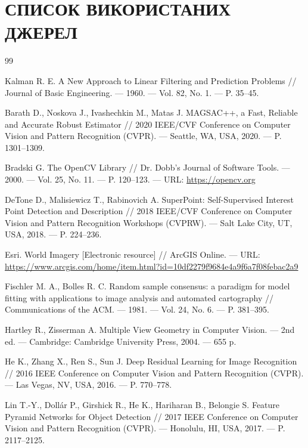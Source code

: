 \documentclass[a4paper, 12pt, titlepage]{article}
\begin{document}
\newpage
\section*{\centering СПИСОК ВИКОРИСТАНИХ ДЖЕРЕЛ}

\begin{thebibliography}{99}

Kalman R. E. A New Approach to Linear Filtering and Prediction Problems // Journal of Basic Engineering. --- 1960. --- Vol. 82, No. 1. --- P. 35--45.

Barath D., Noskova J., Ivashechkin M., Matas J. MAGSAC++, a Fast, Reliable and Accurate Robust Estimator // 2020 IEEE/CVF Conference on Computer Vision and Pattern Recognition (CVPR). --- Seattle, WA, USA, 2020. --- P. 1301--1309.

Bradski G. The OpenCV Library // Dr. Dobb's Journal of Software Tools. --- 2000. --- Vol. 25, No. 11. --- P. 120--123. --- URL: \url{https://opencv.org}

DeTone D., Malisiewicz T., Rabinovich A. SuperPoint: Self-Supervised Interest Point Detection and Description // 2018 IEEE/CVF Conference on Computer Vision and Pattern Recognition Workshops (CVPRW). --- Salt Lake City, UT, USA, 2018. --- P. 224--236.

Esri. World Imagery [Electronic resource] // ArcGIS Online. --- URL: \url{https://www.arcgis.com/home/item.html?id=10df2279f9684e4a9f6a7f08febac2a9}

Fischler M. A., Bolles R. C. Random sample consensus: a paradigm for model fitting with applications to image analysis and automated cartography // Communications of the ACM. --- 1981. --- Vol. 24, No. 6. --- P. 381--395.

Hartley R., Zisserman A. Multiple View Geometry in Computer Vision. --- 2nd ed. --- Cambridge: Cambridge University Press, 2004. --- 655 p.

He K., Zhang X., Ren S., Sun J. Deep Residual Learning for Image Recognition // 2016 IEEE Conference on Computer Vision and Pattern Recognition (CVPR). --- Las Vegas, NV, USA, 2016. --- P. 770--778.

Lin T.-Y., Dollár P., Girshick R., He K., Hariharan B., Belongie S. Feature Pyramid Networks for Object Detection // 2017 IEEE Conference on Computer Vision and Pattern Recognition (CVPR). --- Honolulu, HI, USA, 2017. --- P. 2117--2125.


\end{thebibliography}
\end{document}
